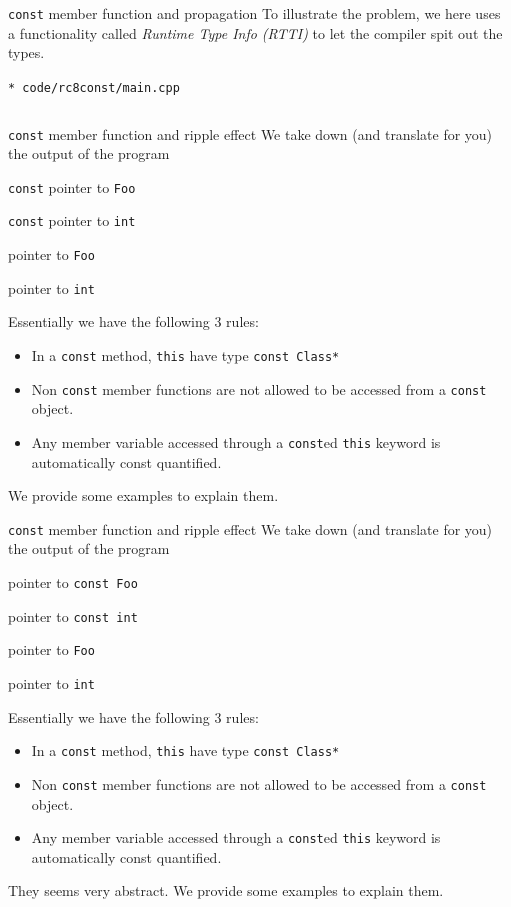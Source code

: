 \begin{frame}[fragile]{\texttt{const} member function and propagation}
To illustrate the problem, we here uses a functionality called \textit{Runtime Type Info (RTTI)} to let the compiler spit out the types.

\texttt{* code/rc8const/main.cpp}
\inputminted[fontsize=\small, baselinestretch=0.865]{c++}{code/rc8const/main.cpp}	
\end{frame}

\begin{frame}{\texttt{const} member function and ripple effect}
We take down (and translate for you) the output of the program
\begin{description}
\item[\texttt{bar()::this}] \texttt{const} pointer to \texttt{Foo}
\item[\texttt{bar()::value}] \texttt{const} pointer to \texttt{int}
\item[\texttt{baz()::this}] pointer to \texttt{Foo}
\item[\texttt{baz()::value}] pointer to \texttt{int}
\end{description}
Essentially we have the following 3 rules:
\begin{itemize}
\item In a \texttt{const} method, \texttt{this} have type \texttt{const Class*}
\item Non \texttt{const} member functions are not allowed to be accessed from a \texttt{const} object.
\item Any member variable accessed through a \texttt{const}ed \texttt{this} keyword is automatically const quantified.
\end{itemize}
We provide some examples to explain them.
\end{frame}

\begin{frame}{\texttt{const} member function and ripple effect}
We take down (and translate for you) the output of the program
\begin{description}
\item[\texttt{bar()::this}]  pointer to \texttt{const Foo}
\item[\texttt{bar()::value}] pointer to \texttt{const int}
\item[\texttt{baz()::this}] pointer to \texttt{Foo}
\item[\texttt{baz()::value}] pointer to \texttt{int}
\end{description}
Essentially we have the following 3 rules:
\begin{itemize}
\item In a \texttt{const} method, \texttt{this} have type \texttt{const Class*}
\item Non \texttt{const} member functions are not allowed to be accessed from a \texttt{const} object.
\item Any member variable accessed through a \texttt{const}ed \texttt{this} keyword is automatically const quantified.
\end{itemize}
They seems very abstract. We provide some examples to explain them.
\end{frame}

